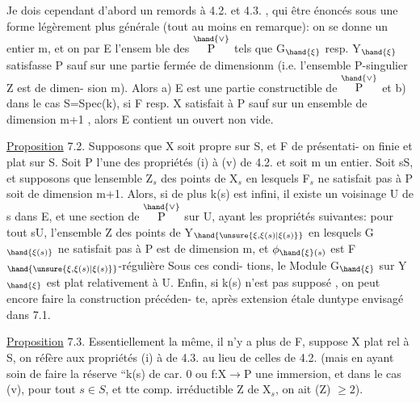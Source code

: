 
Je dois cependant d'abord  un remords à 4.2. et 4.3. , qui
 être énoncés sous une forme légèrement plus générale (tout au
moins en remarque): on se donne un entier m, et on  par E l'ensem
ble des \hand{$\xi\in$}$\overset{\hand{\vee}}{\text{P}}$ tels que G$_{\hand{\xi}}$ resp. Y$_{\hand{\xi}}$ satisfasse P sauf  sur une
partie fermée de dimension\hand{$\leq$}m (i.e. l'ensemble P-singulier Z est de dimen-%
sion\hand{$\leq$} m). Alors a) E est une partie constructible de $\overset{\hand{\vee}}{\text{P}}$ et b) dans le
cas S=Spec(k), si F resp. X satisfait à P sauf  sur un ensemble de
dimension\hand{$\leq$} m+1 , alors E contient un ouvert non vide.

\uline{Proposition} 7.2. Supposons que X soit propre sur S, et F de présentati-%
on finie et plat sur S. Soit P l'une des propriétés (i) à (v) de 4.2.
et soit m un entier. Soit s\hand{$\in$}S, et supposons que 
 lensemble Z$_s$ des points de X$_s$ en lesquels F$_s$ ne satisfait
pas à P soit de dimension \hand{$\leq$} m+1. Alors, si de plus k(s) est infini, il
existe un voisinage U de s dans E, et une section \hand{$\xi$} de $\overset{\hand{\vee}}{\text{P}}$ sur U, ayant
les propriétés suivantes: pour tout s\hand{$\in$}U, l'ensemble Z des points
de  Y$_{\hand{\unsure{\xi,\xi(s)|\xi(s)}}}$ en lesquels G$_{\hand{\xi(s)}}$ ne satisfait pas à P est de dimension
\hand{$\leq$}m, et $\phi_{\hand{\xi}(s)}$ est F$_{\hand{\unsure{\xi,\xi(s)|\xi(s)}}}$-régulière\hand{,}  Sous ces condi-%
tions, le Module G$_{\hand{\xi}}$ sur Y$_{\hand{\xi}}$ est plat relativement à U. Enfin, si k(s)
n'est pas supposé , on peut encore faire la construction précéden-%
te, après extension étale duntype envisagé dans 7.1.

\uline{Proposition} 7.3. Essentiellement la même, il n'y a plus de F, 
suppose X plat rel à S, on réfère aux propriétés (i) à  de 4.3. au
lieu de celles de 4.2. (mais en ayant soin de faire  la réserve
``k(s) de car. 0 ou f:X$\longrightarrow$P une immersion\hand{$\xi$}, et dans le cas (v), pour tout $s\in S$, et tte comp. irréductible Z de X$_s$, on ait (Z) $\geq 2$).





